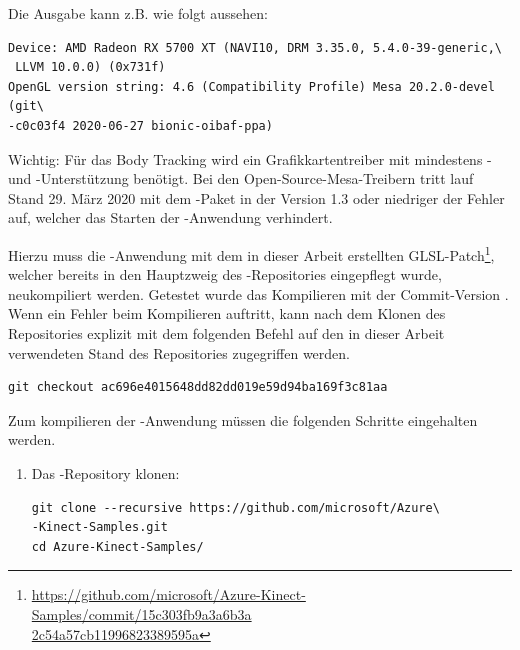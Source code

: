 \begin{enumerate}[label*=\arabic*.]
\begin{enumerate}[label*=\arabic*.]
                Die Ausgabe kann z.B. wie folgt aussehen:
                \begin{lstlisting}[style=bash]
    Device: AMD Radeon RX 5700 XT (NAVI10, DRM 3.35.0, 5.4.0-39-generic,\
 LLVM 10.0.0) (0x731f)
OpenGL version string: 4.6 (Compatibility Profile) Mesa 20.2.0-devel (git\
-c0c03f4 2020-06-27 bionic-oibaf-ppa)
                \end{lstlisting}

                \begin{redbox}{Wichtig:}
                    Für das Body Tracking wird ein Grafikkartentreiber mit mindestens - und -Unterstützung benötigt. Bei den Open-Source-Mesa-Treibern tritt lauf Stand 29. März 2020 mit dem -Paket in der Version 1.3 oder niedriger der Fehler\newline\newline
                    \newline\newline
                    auf, welcher das Starten der \quoteMark{k4abt\_simple\_3d\_viewer}-Anwendung verhindert.

                    Hierzu muss die \quoteMark{simple\_3d\_viewer}-Anwendung mit dem in dieser Arbeit erstellten GLSL-Patch\footnote{\href{https://github.com/microsoft/Azure-Kinect-Samples/commit/15c303fb9a3a6b3a2c54a57cb11996823389595a}{https://github.com/microsoft/Azure-Kinect-Samples/commit/15c303fb9a3a6b3a\\2c54a57cb11996823389595a}}, welcher bereits in den Hauptzweig des -Repositories eingepflegt wurde, neukompiliert werden. Getestet wurde das Kompilieren mit der Commit-Version . Wenn ein Fehler beim Kompilieren auftritt, kann nach dem Klonen des Repositories explizit mit dem folgenden Befehl auf den in dieser Arbeit verwendeten Stand des Repositories zugegriffen werden.
                    \begin{lstlisting}[style=bash]
git checkout ac696e4015648dd82dd019e59d94ba169f3c81aa
                    \end{lstlisting}

                    Zum kompilieren der -Anwendung müssen die folgenden Schritte eingehalten werden.
                    \begin{enumerate}[label=\arabic*.]
                        \item Das -Repository klonen:
                            \begin{lstlisting}[style=bash]
git clone --recursive https://github.com/microsoft/Azure\
-Kinect-Samples.git
cd Azure-Kinect-Samples/
                            \end{lstlisting}


\end{enumerate}
\end{redbox}
\end{enumerate}
\end{enumerate}
